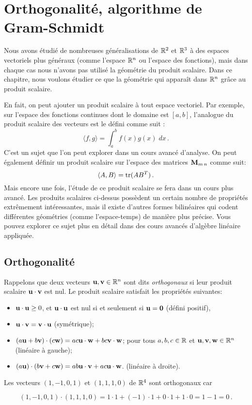 \chapter{Orthogonalité, algorithme de Gram-Schmidt}
\label{chapter:Fr_22-orthogproj}


Nous avons étudié de nombreuses généralisations de $\mathbb{R}^2$ et 
$\mathbb{R}^3$ à des espaces vectoriels plus généraux (comme l'espace $\mathbb{R}^n$ ou l'espace des fonctions), mais dans chaque cas nous n'avons pas utilisé la géométrie du produit scalaire. Dans ce
chapitre, nous voulons étudier ce que la géométrie qui apparaît dans $\mathbb{R}^n$ grâce au produit scalaire.  

En fait, on peut ajouter un produit scalaire à tout espace vectoriel.
Par exemple, sur l'espace des fonctions continues dont le domaine est $[a,b]$, l'analogue du produit scalaire des vecteurs est le  défini comme suit :
$$
\langle f, g \rangle = \int_a^b f(x)g(x)\;dx\,.
$$
C'est un sujet que l'on peut explorer dans un cours avanc\'e d'analyse. 
On peut également d\'efinir un produit scalaire sur l'espace des matrices $\mathbf{M}_{m\, n}$ comme suit: 
$$
\langle A, B \rangle = \operatorname{ tr} (AB^T)\,.
$$
Mais encore une fois, l'étude de ce produit scalaire se fera dans un cours plus avancé.
Les produits scalaires ci-dessus possèdent un certain nombre de 
propriétés extrêmement intéressantes, mais il existe d'autres formes bilinéaires
qui codent différentes géométries (comme l'espace-temps) de manière plus précise.
Vous pouvez explorer ce sujet plus en détail dans des cours avanc\'es d'algèbre linéaire appliquée.



\section{Orthogonalit\'e}

Rappelons que deux vecteurs $\mathbf{u}, \mathbf{v} \in \mathbb{R}^n$ sont dits \emph{orthogonaux} si leur
produit scalaire $\mathbf{u} \cdot \mathbf{v}$ est nul.  Le produit scalaire satisfait les propri\'et\'es suivantes:
\begin{itemize}
\item $\mathbf{u} \cdot \mathbf{u} \geq 0$, et $\mathbf{u}\cdot\mathbf{u}$ est nul si et seulement si $\mathbf{u} = \mathbf{0}$ (défini positif),
\item $\mathbf{u} \cdot \mathbf{v} = \mathbf{v} \cdot \mathbf{u}$ (symétrique);
\item $(a\mathbf{u} + b\mathbf{v})\cdot(c\mathbf{w}) = ac \mathbf{u} \cdot \mathbf{w} + bc \mathbf{v} \cdot \mathbf{w}$;
pour tous $a,b,c\in\mathbb{R}$ et $\mathbf{u},\mathbf{v},\mathbf{w} \in \mathbb{R}^n$ (linéaire à gauche);
\item $(a\mathbf{u}) \cdot (b\mathbf{v} + c\mathbf{w}) = ab\mathbf{u} \cdot \mathbf{v} + ac \mathbf{u} \cdot \mathbf{w}$.
(linéaire à droite).
\end{itemize}
\begin{myexample} Les vecteurs $(1,-1,0,1)$ et $(1,1,1,0)$ de $\mathbb{R}^4$ sont orthogonaux car 

$$(1,-1,0,1)\cdot(1,1,1,0)=1\cdot 1 + (-1) \cdot 1 + 0\cdot 1 + 1 \cdot 0=1-1=0\,.$$

\end{myexample}


